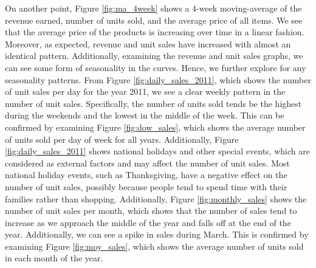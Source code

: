 On another point, Figure \ref{fig:ma_4week} shows a 4-week moving-average of the revenue earned, number of units sold, and the average price of all items.
We see that the average price of the products is increasing over time in a linear fashion. Moreover, as expected, revenue and unit sales have increased with almost an identical pattern. Additionally, examining the revenue and unit sales graphs, we can see some form of seasonality in the curves.
Hence, we further explore for any seasonality patterns. From Figure \ref{fig:daily_sales_2011}, which shows the number of unit sales per day for the year 2011, we see a clear weekly pattern in the number of unit sales.
Specifically, the number of units sold tends be the highest during the weekends and the lowest in the middle of the week. 
This can be confirmed by examining Figure \ref{fig:dow_sales}, which shows the average number of units sold per day of week for all years.
Additionally, Figure \ref{fig:daily_sales_2011} shows national holidays and other special events, which are considered as external factors and may affect the number of unit sales. 
Most national holiday events, such as Thanksgiving, have a negative effect on the number of unit sales, possibly because people tend to spend time with their families rather than shopping. 
Additionally, Figure \ref{fig:monthly_sales} shows the number of unit sales per month, which shows that the number of sales tend to increase as we approach the middle of the year and falls off at the end of the year.
Additionally, we can see a spike in sales during March.
This is confirmed by examining Figure \ref{fig:moy_sales}, which shows the average number of units sold in each month of the year. 

